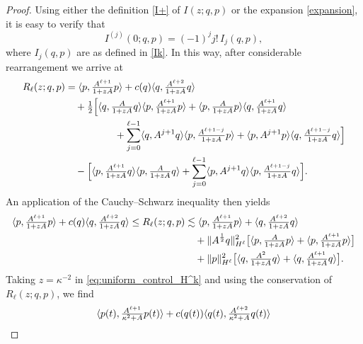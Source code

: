 \documentclass{amsart}
\theoremstyle{definition}
\numberwithin{equation}{section}
\renewcommand{\H}{\mathcal H}
\newcommand{\la}{\langle}
\newcommand{\ra}{\rangle}
\begin{document}
\begin{proof}
Using either the definition \eqref{I+} of $I(z;q,p)$ or the expansion \eqref{expansion}, it is easy to verify that
$$
I^{(j)}(0;q,p)= (-1)^j j! \,I_j(q,p),
$$
where $I_j(q,p)$ are  as defined in \eqref{Ik}. In this way, after considerable rearrangement we arrive at 
\begin{align*}
R_\ell(z;q,p )&=\la p, \tfrac{A^{\ell+1}}{1+zA}p\ra + c(q)\la q, \tfrac{A^{\ell+2}}{1+zA}q\ra\\ 
&\quad+\tfrac12\Bigl[\la q, \tfrac{A}{1+zA}q\ra\la p, \tfrac{A^{\ell+1}}{1+zA}p\ra +\la p,  \tfrac{A}{1+zA}p\ra \la q,\tfrac{A^{\ell+1}}{1+zA}q\ra \\
&\quad\qquad\qquad+\sum_{j=0}^{\ell-1}\la q, A^{j+1} q\ra\la p,\tfrac{A^{\ell+1-j}}{1+zA}p\ra+\la p, A^{j+1} p\ra \la q,\tfrac{A^{\ell+1-j}}{1+zA}q\ra \Bigr]\\
&\quad - \Bigl[\la p, \tfrac{A^{\ell+1}}{1+zA}q\ra\la p, \tfrac{A}{1+zA}q\ra+\sum_{j=0}^{\ell-1}\la p, A^{j+1} q\ra \la p,\tfrac{A^{\ell+1-j}}{1+zA}q\ra\Bigr].
\end{align*}
An application of the Cauchy--Schwarz inequality then yields 
\begin{align}\label{eq:uniform_control_H^k}
\la p, \tfrac{A^{\ell+1}}{1+zA}p\ra + c(q)\la q, \tfrac{A^{\ell+2}}{1+zA}q\ra
\leq R_\ell(z;q,p) &\lesssim\la p, \tfrac{A^{\ell+1}}{1+zA}p\ra + \la q,\tfrac{A^{\ell+2}}{1+zA}q\ra \notag\\
&\quad +\|A^{\frac12}q\|_{ H^{\ell}}^2\bigl[\la p,\tfrac{A}{1+zA}p\ra + \la p,\tfrac{A^{\ell+1}}{1+zA}p\ra\bigr]\\
&\quad +\|p\|_{ H^\ell}^2\bigl[\la q,\tfrac{A^{2}}{1+zA}q\ra + \la q,\tfrac{A^{\ell+1}}{1+zA}q\ra\bigr].\notag
\end{align}
Taking $z=\kappa^{-2}$ in \eqref{eq:uniform_control_H^k} and using the conservation of $R_\ell(z;q,p)$, we find
\begin{align}\label{613}
\la p(t), \tfrac{A^{\ell+1}}{\kappa^2+A}&p(t)\ra + c(q(t))\la q(t), \tfrac{A^{\ell+2}}{\kappa^2+A}q(t)\ra\notag\\

\end{align}
\end{proof}
\end{document}
